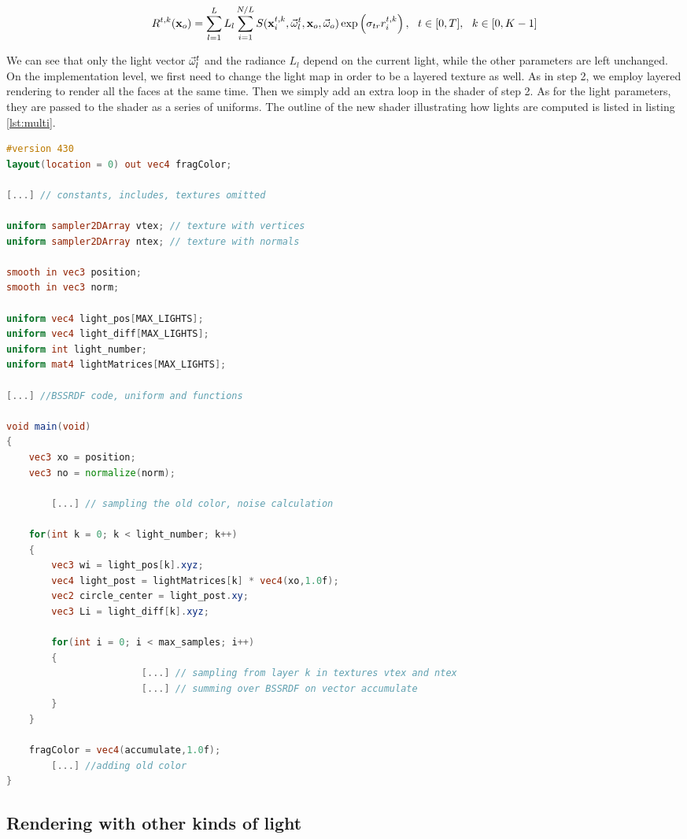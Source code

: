 $$
R^{t,k}(\mathbf{x}_o) = \sum_{l = 1}^L L_l \sum_{i = 1}^{N/L} S(\mathbf{x}^{t,k}_i, \vec{\omega}^t_l, \mathbf{x}_o, \vec{\omega}_o) \exp\left(\sigma_{tr} r^{t,k}_i\right), \ \ t \in [0,T], \ \ k \in [0,K-1] 
$$

We can see that only the light vector $\vec{\omega}^t_l$ and the radiance $L_l$ depend on the current light, while the other parameters are left unchanged. On the implementation level, we first need to change the light map in order to be a layered texture as well. As in step 2, we employ layered rendering to render all the faces at the same time. Then we simply add an extra loop in the shader of step 2. As for the light parameters, they are passed to the shader as a series of uniforms. The outline of the new shader illustrating how lights are computed is listed in listing \ref{lst:multi}.

\begin{lstlisting}[language=GLSL,label=lst:multi,caption={Outline of the shader in step 2 with support for multiple lights.}]
#version 430
layout(location = 0) out vec4 fragColor;

[...] // constants, includes, textures omitted

uniform sampler2DArray vtex; // texture with vertices
uniform sampler2DArray ntex; // texture with normals

smooth in vec3 position;
smooth in vec3 norm;

uniform vec4 light_pos[MAX_LIGHTS];
uniform vec4 light_diff[MAX_LIGHTS];
uniform int light_number;
uniform mat4 lightMatrices[MAX_LIGHTS];

[...] //BSSRDF code, uniform and functions

void main(void)
{
    vec3 xo = position;
    vec3 no = normalize(norm);

		[...] // sampling the old color, noise calculation

    for(int k = 0; k < light_number; k++)
    {
        vec3 wi = light_pos[k].xyz;
        vec4 light_post = lightMatrices[k] * vec4(xo,1.0f);
        vec2 circle_center = light_post.xy;
        vec3 Li = light_diff[k].xyz;
				
        for(int i = 0; i < max_samples; i++)
        {
						[...] // sampling from layer k in textures vtex and ntex
						[...] // summing over BSSRDF on vector accumulate
        }
    }

    fragColor = vec4(accumulate,1.0f);
		[...] //adding old color
}
\end{lstlisting}

\subsection{Rendering with other kinds of light}

